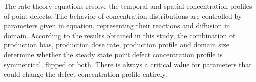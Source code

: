 \documentclass[a4paper]{article}
\begin{document}
The rate theory equations resolve the temporal and spatial concentration profiles of point defects. The behavior of concentration distributions are controlled by parameters given in equation, representing their reactions and diffusion in domain. According to the results obtained in this study, the combination of production bias, production dose rate, production profile and domain size determine whether the steady state point defect concentration profile is symmetrical, flipped or both. There is always a critical value for parameters that could change the defect concentration profile entirely.



\end{document}
